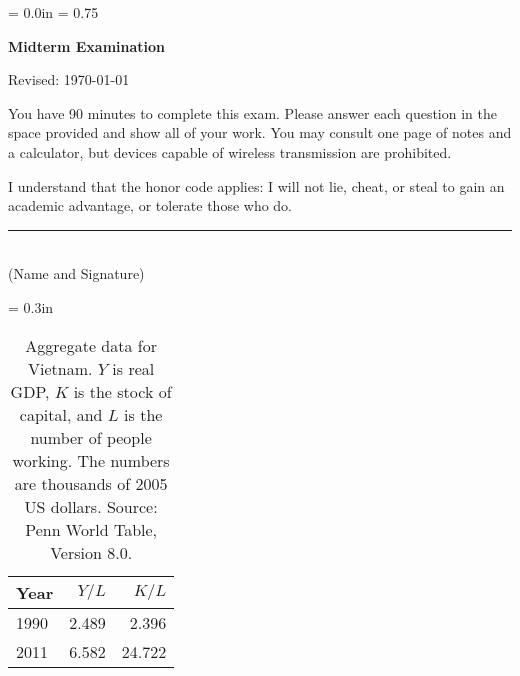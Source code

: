 \documentclass[letterpaper,12pt]{exam}
\def\HeadName{Midterm Examination}
\begin{document}
\parindent = 0.0in
\parskip = 0.75\bigskipamount
\thispagestyle{empty}%
\Head

\centerline{\large \bf \HeadName}%
\centerline{Revised:  \today}

\bigskip
You have 90 minutes to complete this exam.  Please answer each
question in the space provided and show all of your work.
You may consult one page of notes and a calculator,
but devices capable of wireless transmission are prohibited.

I understand that the honor code applies: I will not lie, cheat,
or steal to gain an academic advantage, or tolerate those who do.

\begin{flushright}
\rule{4in}{0.5pt} \\ (Name and Signature)
\end{flushright}

\begin{table}[h]
    \centering
    \tabcolsep = 0.3in
    \begin{tabular}{lrr}
    \toprule
    Year            &  $ Y/L $   &  $K/L$   \\
    \midrule
    1990            &   2.489  &   2.396   \\
    2011            &   6.582  &  24.722   \\
    \bottomrule
    \end{tabular}
    \caption{Aggregate data for Vietnam.
    $Y$ is real GDP, $K$ is the stock of capital, and $L$ is the number
    of people working.
    The numbers are thousands of 2005 US dollars.
    Source:  Penn World Table, Version 8.0.}
    \label{tab:vietnam}
\end{table}
\end{document}
